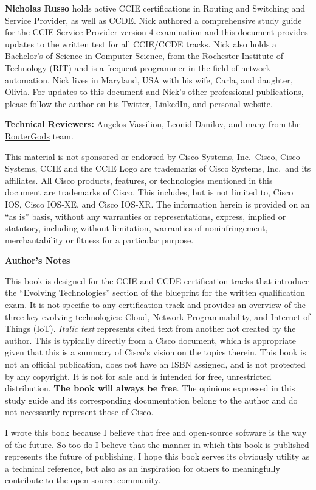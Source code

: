 \noindent
\textbf{Nicholas Russo} holds active CCIE certifications in Routing and
Switching and Service Provider, as well as CCDE\@. Nick authored a comprehensive
study guide for the CCIE Service Provider version 4 examination and this
document provides updates to the written test for all CCIE/CCDE tracks. Nick
also holds a Bachelor’s of Science in Computer Science, from the Rochester
Institute of Technology (RIT) and is a frequent programmer in the field of
network automation. Nick lives in Maryland, USA with his wife, Carla, and
daughter, Olivia. For updates to this document and Nick’s other professional
publications, please follow the author on his
\href{https://twitter.com/nickrusso42518}{Twitter},
\href{https://www.linkedin.com/in/njrusmc}{LinkedIn}, and
\href{http://njrusmc.net}{personal website}.


\textbf{Technical Reviewers:}
\href{https://twitter.com/ipmess}{Angelos Vassiliou},
\href{https://twitter.com/iosxrqna}{Leonid Danilov}, and many from the
\href{https://www.meetup.com/routergods}{RouterGods} team.

This material is not sponsored or endorsed by Cisco Systems, Inc.\ Cisco, Cisco
Systems, CCIE and the CCIE Logo are trademarks of Cisco Systems, Inc.\ and its
affiliates. All Cisco products, features, or technologies mentioned in this
document are trademarks of Cisco. This includes, but is not limited to, Cisco
IOS, Cisco IOS-XE, and Cisco IOS-XR\@. The information herein is provided on an
``as is'' basis, without any warranties or representations, express, implied or
statutory, including without limitation, warranties of noninfringement,
merchantability or fitness for a particular purpose.

\textbf{Author’s Notes}

This book is designed for the CCIE and CCDE certification tracks that
introduce the ``Evolving Technologies'' section of the blueprint for the written
qualification exam. It is not specific to any certification track and provides
an overview of the three key evolving technologies: Cloud, Network
Programmability, and Internet of Things (IoT). \textit{Italic text} represents
cited text from another not created by the author. This is typically directly
from a Cisco document, which is appropriate given that this is a summary of
Cisco’s vision on the topics therein. This book is not an official
publication, does not have an ISBN assigned, and is not protected by any
copyright. It is not for sale and is intended for free, unrestricted
distribution. \textbf{The book will always be free}. The opinions expressed in
this study guide and its corresponding documentation belong to the author and
do not necessarily represent those of Cisco.

I wrote this book because I believe that free and open-source software is the
way of the future. So too do I believe that the manner in which this book is
published represents the future of publishing. I hope this book serves its
obviously utility as a technical reference, but also as an inspiration for
others to meaningfully contribute to the open-source community.
